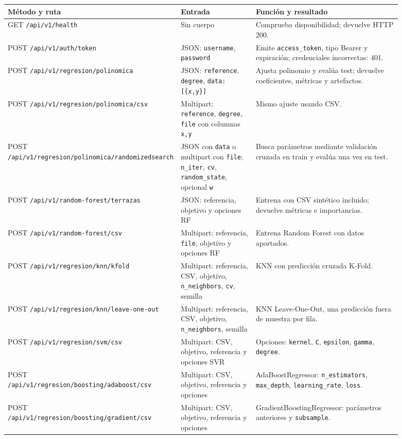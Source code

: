 \documentclass[11pt,a4paper]{article}
\begin{document}
\begin{longtable}{p{0.23\linewidth}p{0.22\linewidth}p{0.44\linewidth}}
\toprule Método y ruta & Entrada & Función y resultado \\
\midrule
\endhead
GET \texttt{/api/v1/health} & Sin cuerpo & Comprueba disponibilidad; devuelve HTTP 200.\\
POST \texttt{/api/v1/auth/token} & JSON: \texttt{username}, \texttt{password} & Emite \texttt{access\_token}, tipo Bearer y expiración; credenciales incorrectas: 401.\\
POST \texttt{/api/v1/regresion/polinomica} & JSON: \texttt{reference}, \texttt{degree}, \texttt{data:[\{x,y\}]} & Ajusta polinomio y evalúa test; devuelve coeficientes, métricas y artefactos.\\
POST \texttt{/api/v1/regresion/polinomica/csv} & Multipart: \texttt{reference}, \texttt{degree}, \texttt{file} con columnas \texttt{x,y} & Mismo ajuste usando CSV.\\
POST \texttt{/api/v1/regresion/polinomica/randomizedsearch} & JSON con \texttt{data} o multipart con \texttt{file}; \texttt{n\_iter}, \texttt{cv}, \texttt{random\_state}, opcional \texttt{w} & Busca parámetros mediante validación cruzada en train y evalúa una vez en test.\\
POST \texttt{/api/v1/random-forest/terrazas} & JSON: referencia, objetivo y opciones RF & Entrena con CSV sintético incluido; devuelve métricas e importancias.\\
POST \texttt{/api/v1/random-forest/csv} & Multipart: referencia, \texttt{file}, objetivo y opciones RF & Entrena Random Forest con datos aportados.\\
POST \texttt{/api/v1/regresion/knn/kfold} & Multipart: referencia, CSV, objetivo, \texttt{n\_neighbors}, \texttt{cv}, semilla & KNN con predicción cruzada K-Fold.\\
POST \texttt{/api/v1/regresion/knn/leave-one-out} & Multipart: referencia, CSV, objetivo, \texttt{n\_neighbors}, semilla & KNN Leave-One-Out, una predicción fuera de muestra por fila.\\
POST \texttt{/api/v1/regresion/svm/csv} & Multipart: CSV, objetivo, referencia y opciones SVR & Opciones: \texttt{kernel}, \texttt{C}, \texttt{epsilon}, \texttt{gamma}, \texttt{degree}.\\
POST \texttt{/api/v1/regresion/boosting/adaboost/csv} & Multipart: CSV, objetivo, referencia y opciones & AdaBoostRegressor: \texttt{n\_estimators}, \texttt{max\_depth}, \texttt{learning\_rate}, \texttt{loss}.\\
POST \texttt{/api/v1/regresion/boosting/gradient/csv} & Multipart: CSV, objetivo, referencia y opciones & GradientBoostingRegressor: parámetros anteriores y \texttt{subsample}.\\
\bottomrule
\end{longtable}
\end{document}
